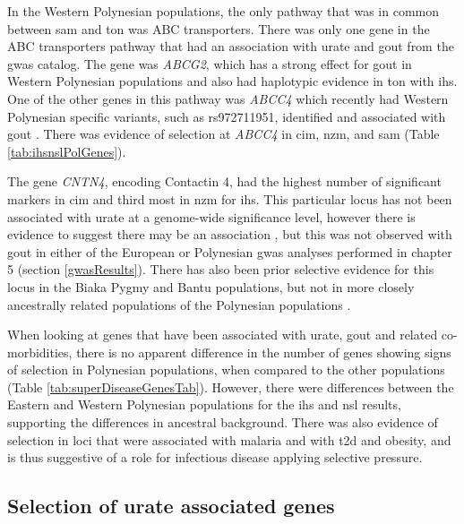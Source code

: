 \documentclass[twoside,openright]{report}
\begin{document}
In the Western Polynesian populations, the only pathway that was in
common between \gls{sam} and \gls{ton} was ABC transporters. There was
only one gene in the ABC transporters pathway that had an association
with urate and gout from the \gls{gwas} catalog. The gene was
\emph{ABCG2}, which has a strong effect for gout in Western Polynesian
populations \citep{Phipps-Green2010} and also had haplotypic evidence in
\gls{ton} with \gls{ihs}. One of the other genes in this pathway was
\emph{ABCC4} which recently had Western Polynesian specific variants,
such as rs972711951, identified and associated with gout
\citep{Tanner2017}. There was evidence of selection at \emph{ABCC4} in
\gls{cim}, \gls{nzm}, and \gls{sam} (Table \ref{tab:ihsnslPolGenes}).

The gene \emph{CNTN4}, encoding Contactin 4, had the highest number of
significant markers in \gls{cim} and third most in \gls{nzm} for
\gls{ihs}. This particular locus has not been associated with urate at a
genome-wide significance level, however there is evidence to suggest
there may be an association \citep{Chittoor2016}, but this was not
observed with gout in either of the European or Polynesian \gls{gwas}
analyses performed in chapter 5 (section \ref{gwasResults}). There has
also been prior selective evidence for this locus in the Biaka Pygmy and
Bantu populations, but not in more closely ancestrally related
populations of the Polynesian populations \citep{pickrell2009signals}.

When looking at genes that have been associated with urate, gout and
related co-morbidities, there is no apparent difference in the number of
genes showing signs of selection in Polynesian populations, when
compared to the other populations (Table
\ref{tab:superDiseaseGenesTab}). However, there were differences between
the Eastern and Western Polynesian populations for the \gls{ihs} and
\gls{nsl} results, supporting the differences in ancestral background.
There was also evidence of selection in loci that were associated with
malaria and with \gls{t2d} and obesity, and is thus suggestive of a role
for infectious disease applying selective pressure.

\subsection{Selection of urate associated
genes}\label{selection-of-urate-associated-genes}
\end{document}
